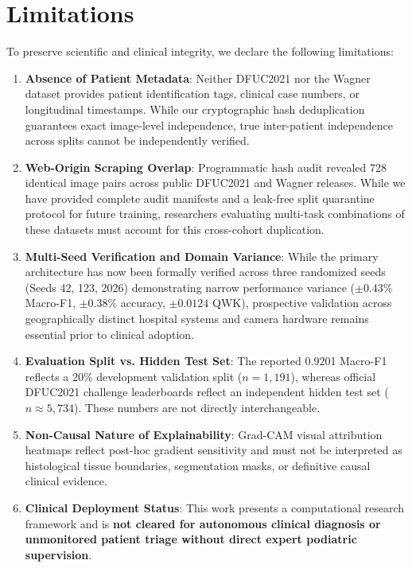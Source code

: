 \documentclass[journal]{IEEEtran}
\begin{document}
\section{Limitations}
To preserve scientific and clinical integrity, we declare the following limitations:
\begin{enumerate}
    \item \textbf{Absence of Patient Metadata}: Neither DFUC2021 nor the Wagner dataset provides patient identification tags, clinical case numbers, or longitudinal timestamps. While our cryptographic hash deduplication guarantees exact image-level independence, true inter-patient independence across splits cannot be independently verified.
    \item \textbf{Web-Origin Scraping Overlap}: Programmatic hash audit revealed 728 identical image pairs across public DFUC2021 and Wagner releases. While we have provided complete audit manifests and a leak-free split quarantine protocol for future training, researchers evaluating multi-task combinations of these datasets must account for this cross-cohort duplication.
    \item \textbf{Multi-Seed Verification and Domain Variance}: While the primary architecture has now been formally verified across three randomized seeds (Seeds 42, 123, 2026) demonstrating narrow performance variance ($\pm 0.43\%$ Macro-F1, $\pm 0.38\%$ accuracy, $\pm 0.0124$ QWK), prospective validation across geographically distinct hospital systems and camera hardware remains essential prior to clinical adoption.
    \item \textbf{Evaluation Split vs. Hidden Test Set}: The reported 0.9201 Macro-F1 reflects a 20\% development validation split ($n = 1,191$), whereas official DFUC2021 challenge leaderboards reflect an independent hidden test set ($n \approx 5,734$). These numbers are not directly interchangeable.
    \item \textbf{Non-Causal Nature of Explainability}: Grad-CAM visual attribution heatmaps reflect post-hoc gradient sensitivity and must not be interpreted as histological tissue boundaries, segmentation masks, or definitive causal clinical evidence.
    \item \textbf{Clinical Deployment Status}: This work presents a computational research framework and is \textbf{not cleared for autonomous clinical diagnosis or unmonitored patient triage without direct expert podiatric supervision}.
\end{enumerate}

\end{document}
